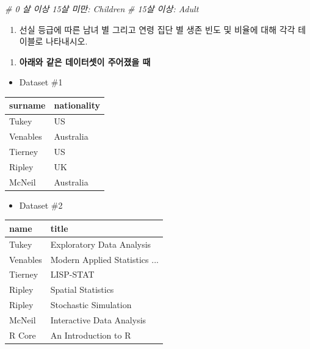 \documentclass[
  11pt,
]{krantz}
\newenvironment{Shaded}{\begin{snugshade}}{\end{snugshade}}
\newcommand{\CommentTok}[1]{\textcolor[rgb]{0.37,0.37,0.37}{\textit{#1}}}
\providecommand{\tightlist}{%
  \setlength{\itemsep}{0pt}\setlength{\parskip}{0pt}}
\begin{document}
\footnotesize

\begin{Shaded}
\begin{Highlighting}[]
\CommentTok{# 0 살 이상 15살 미만: Children}
\CommentTok{# 15살 이상: Adult}
\end{Highlighting}
\end{Shaded}

\normalsize

\begin{enumerate}
\def\labelenumi{\alph{enumi})}
\setcounter{enumi}{4}
\tightlist
\item
  선실 등급에 따른 남녀 별 그리고 연령 집단 별 생존 빈도 및 비율에 대해 각각 테이블로 나타내시오.
\end{enumerate}

\begin{enumerate}
\def\labelenumi{\arabic{enumi}.}
\setcounter{enumi}{3}
\tightlist
\item
  \textbf{아래와 같은 데이터셋이 주어졌을 때 }
\end{enumerate}

\begin{itemize}
\tightlist
\item
  Dataset \#1
\end{itemize}

\footnotesize

\begin{tabular}{l|l}
\hline
surname & nationality\\
\hline
Tukey & US\\
\hline
Venables & Australia\\
\hline
Tierney & US\\
\hline
Ripley & UK\\
\hline
McNeil & Australia\\
\hline
\end{tabular}

\normalsize

\begin{itemize}
\tightlist
\item
  Dataset \#2
\end{itemize}

\footnotesize

\begin{tabular}{l|l}
\hline
name & title\\
\hline
Tukey & Exploratory Data Analysis\\
\hline
Venables & Modern Applied Statistics ...\\
\hline
Tierney & LISP-STAT\\
\hline
Ripley & Spatial Statistics\\
\hline
Ripley & Stochastic Simulation\\
\hline
McNeil & Interactive Data Analysis\\
\hline
R Core & An Introduction to R\\
\hline
\end{tabular}
\end{document}
